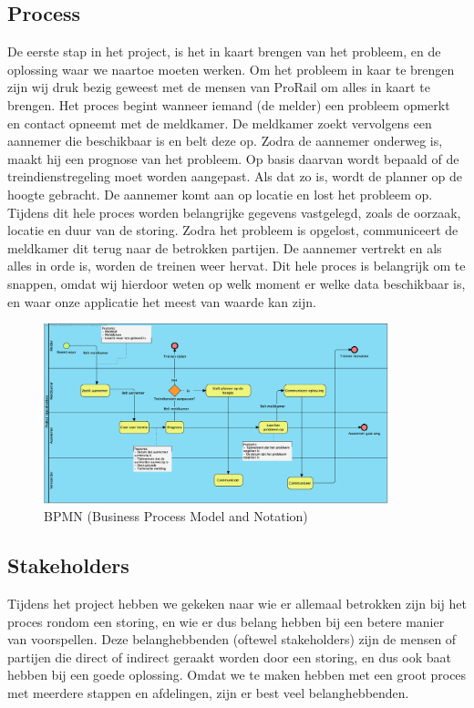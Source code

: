 \documentclass{article}
\begin{document}
\subsection{Process}
De eerste stap in het project, is het in kaart brengen van het probleem, en de oplossing waar we naartoe moeten werken. Om het probleem in kaar te brengen zijn wij druk bezig geweest met de mensen van ProRail om alles in kaart te brengen. Het proces begint wanneer iemand (de melder) een probleem opmerkt en contact opneemt met de meldkamer. De meldkamer zoekt vervolgens een aannemer die beschikbaar is en belt deze op. Zodra de aannemer onderweg is, maakt hij een prognose van het probleem. Op basis daarvan wordt bepaald of de treindienstregeling moet worden aangepast. Als dat zo is, wordt de planner op de hoogte gebracht. De aannemer komt aan op locatie en lost het probleem op. Tijdens dit hele proces worden belangrijke gegevens vastgelegd, zoals de oorzaak, locatie en duur van de storing. Zodra het probleem is opgelost, communiceert de meldkamer dit terug naar de betrokken partijen. De aannemer vertrekt en als alles in orde is, worden de treinen weer hervat. Dit hele proces is belangrijk om te snappen, omdat wij hierdoor weten op welk moment er welke data beschikbaar is, en waar onze applicatie het meest van waarde kan zijn.

\begin{figure}[H]
    \centering
    \includegraphics[width=10cm]{bpmn.png}
    \caption{BPMN (Business Process Model and Notation)}
\end{figure}

\subsection{Stakeholders}
Tijdens het project hebben we gekeken naar wie er allemaal betrokken zijn bij het proces rondom een storing, en wie er dus belang hebben bij een betere manier van voorspellen. Deze belanghebbenden (oftewel stakeholders) zijn de mensen of partijen die direct of indirect geraakt worden door een storing, en dus ook baat hebben bij een goede oplossing. Omdat we te maken hebben met een groot proces met meerdere stappen en afdelingen, zijn er best veel belanghebbenden.
\end{document}
